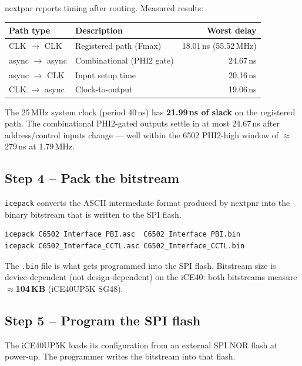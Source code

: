 \documentclass[11pt,a4paper]{article}
\newcommand{\cmd}[1]{\texttt{#1}}
\newcommand{\file}[1]{\texttt{#1}}
\begin{document}
nextpnr reports timing after routing.  Measured results:

\begin{center}
\begin{tabular}{llr}
\toprule
\textbf{Path type} & \textbf{Description} & \textbf{Worst delay} \\
\midrule
CLK $\to$ CLK   & Registered path (Fmax) & 18.01\,ns (55.52\,MHz) \\
async $\to$ async & Combinational (PHI2 gate) & 24.67\,ns \\
async $\to$ CLK  & Input setup time        & 20.16\,ns \\
CLK $\to$ async  & Clock-to-output         & 19.06\,ns \\
\bottomrule
\end{tabular}
\end{center}

The 25\,MHz system clock (period 40\,ns) has \textbf{21.99\,ns of slack}
on the registered path.  The combinational PHI2-gated outputs settle in
at most 24.67\,ns after address/control inputs change --- well within the
6502 PHI2-high window of $\approx$279\,ns at 1.79\,MHz.

\subsection{Step 4 -- Pack the bitstream}

\cmd{icepack} converts the ASCII intermediate format produced by
nextpnr into the binary bitstream that is written to the SPI flash.

\begin{lstlisting}[style=shell,caption={Pack binary bitstreams}]
icepack C6502_Interface_PBI.asc  C6502_Interface_PBI.bin
icepack C6502_Interface_CCTL.asc C6502_Interface_CCTL.bin
\end{lstlisting}

The \file{.bin} file is what gets programmed into the SPI flash.
Bitstream size is device-dependent (not design-dependent) on the iCE40:
both bitstreams measure \textbf{$\approx$104\,KB} (iCE40UP5K SG48).

\subsection{Step 5 -- Program the SPI flash}

The iCE40UP5K loads its configuration from an external SPI NOR flash
at power-up.  The programmer writes the bitstream into that flash.
\end{document}

